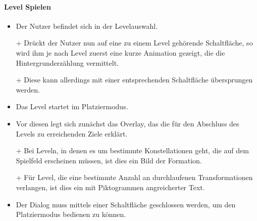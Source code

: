 \paragraph{Level Spielen}\mbox{}\newline
\begin{itemize}
\item Der Nutzer befindet sich in der Levelauswahl.
\item[+] Drückt der Nutzer nun auf eine zu einem
Level gehörende Schaltfläche, so wird ihm je nach Level zuerst eine kurze
Animation gezeigt, die die Hintergrunderzählung vermittelt. 
\item[+] Diese kann allerdings mit einer entsprechenden Schaltfläche übersprungen werden.
\item Das Level startet im Platziermodus.
\item Vor diesen legt sich zunächst das Overlay, das die für den Abschluss des Levels zu erreichenden Ziele
erklärt.
\item[+] Bei Leveln, in denen es um bestimmte Konstellationen geht, die auf
dem Spielfeld erscheinen müssen, ist dies ein Bild der Formation.
\item[+] Für Level, die eine bestimmte Anzahl an durchlaufenen Transformationen
verlangen, ist dies ein mit Piktogrammen angreicherter Text.
\item Der Dialog muss mittels einer Schaltfläche geschlossen werden, um den
Platziermodus bedienen zu können. 
\end{itemize}


